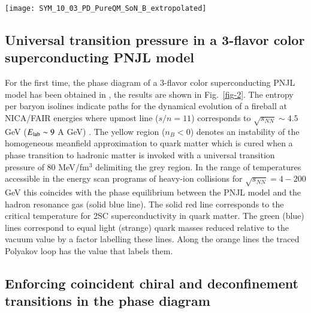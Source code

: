 \documentclass{webofc}
\begin{document}
\begin{figure*}[!t]
\centering
\sidecaption
\texttt{[image: SYM\_10\_03\_PD\_PureQM\_SoN\_B\_extropolated]}
\caption{Phase diagram of the three-flavor color superconducting PNJL model for symmetric quark matter
from \cite{8}.  For details see text in Subsect.~\ref{ssec:ayriyan}.
}
\label{fig-2}       %
\end{figure*}

\subsection{Universal transition pressure in a 3-flavor  color superconducting PNJL model}
\label{ssec:ayriyan}

For the first time, the phase diagram of a 3-flavor color superconducting PNJL model has been obtained in \cite{8},  the results are shown in Fig.~\ref{fig-2}.
The entropy per baryon isolines indicate paths for the dynamical evolution of a fireball at NICA/FAIR energies where upmost line ($s/n=11$) corresponds to $\sqrt{s_{NN}}\sim 4.5$ GeV ($E_{\rm lab}\sim 9$ A GeV) \cite{Ivanov:2016hes}.
The yellow region ($n_B<0$) denotes an instability of the homogeneous meanfield approximation to quark matter which is cured when a phase transition to hadronic matter is invoked with a universal transition pressure of 80 MeV/fm$^3$ \cite{Petran:2013qla} delimiting the grey region. 
In the range of temperatures accessible in the energy scan programs of heavy-ion collisions for 
$\sqrt{s_{NN}}=4 - 200$ GeV this coincides with the phase equilibrium between the PNJL model and the hadron resonance gas (solid blue line). The solid red line corresponds to the critical temperature for 2SC superconductivity in quark matter. The green (blue) lines correspond to equal light (strange) quark masses  reduced relative to the vacuum value by a factor labelling these lines. Along the orange lines the traced Polyakov loop has the value that labels them. 

\subsection{Enforcing coincident chiral and deconfinement transitions in the phase diagram}
\end{document}
